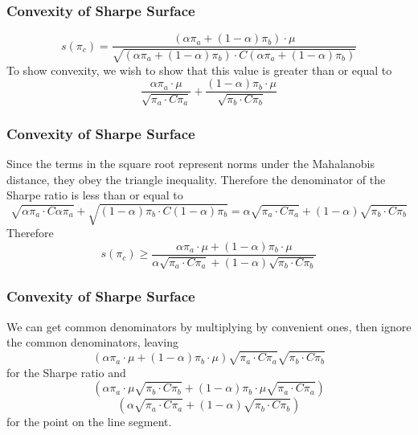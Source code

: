 \documentclass{beamer}
\begin{document}
\begin{frame}
\frametitle{Convexity of Sharpe Surface}
\[s(\pi_c) = \frac{(\alpha \pi_a + (1-\alpha)\pi_b) \cdot \mu}{\sqrt{(\alpha \pi_a + (1-\alpha)\pi_b)\cdot C(\alpha \pi_a + (1-\alpha)\pi_b)}}\]
To show convexity, we wish to show that this value is greater than or equal to
\[\frac{\alpha \pi_a\cdot \mu }{\sqrt{\pi_a \cdot C \pi_a}} +\frac{ (1-\alpha) \pi_b\cdot \mu }{\sqrt{\pi_b \cdot C \pi_b}}\]
\end{frame}

\begin{frame}
\frametitle{Convexity of Sharpe Surface}
Since the terms in the square root represent norms under the Mahalanobis distance, they obey the triangle inequality.  Therefore the denominator of the Sharpe ratio is less than or equal to
\[\sqrt{\alpha \pi_a \cdot C\alpha \pi_a} +\sqrt{ (1-\alpha)\pi_b \cdot C(1-\alpha)\pi_b} = \alpha\sqrt{ \pi_a \cdot C \pi_a} +(1-\alpha) \sqrt{ \pi_b \cdot C\pi_b}\]
Therefore
\[s(\pi_c) \geq \frac{\alpha \pi_a \cdot \mu + (1-\alpha)\pi_b \cdot \mu}{\alpha\sqrt{ \pi_a \cdot C \pi_a} +(1-\alpha) \sqrt{ \pi_b \cdot C\pi_b}}\]
\end{frame}

\begin{frame}
\frametitle{Convexity of Sharpe Surface}
We can get common denominators by multiplying by convenient ones, then ignore the common denominators, leaving
\[(\alpha \pi_a \cdot \mu + (1-\alpha)\pi_b \cdot \mu)\sqrt{\pi_a \cdot C \pi_a}\sqrt{\pi_b \cdot C \pi_b}\]
for the Sharpe ratio and
\[(\alpha \pi_a \cdot \mu \sqrt{\pi_b \cdot C \pi_b} + (1-\alpha) \pi_b\cdot \mu \sqrt{\pi_a \cdot C \pi_a})\]
\[(\alpha\sqrt{ \pi_a \cdot C \pi_a} +(1-\alpha) \sqrt{ \pi_b \cdot C\pi_b})\]
for the point on the line segment.
\end{frame}
\end{document}
